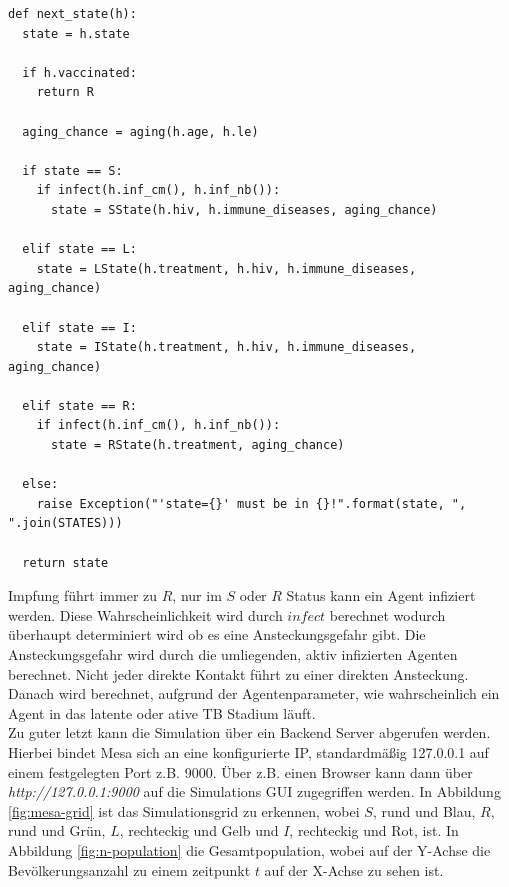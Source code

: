 \documentclass[paper=a4, fontsize=11pt, ngerman, abstract=on]{scrartcl}
\numberwithin{equation}{section} %
\numberwithin{figure}{section} %
\numberwithin{table}{section} %
\begin{document}
\begin{lstlisting}[style=python]
def next_state(h):
  state = h.state

  if h.vaccinated:
    return R

  aging_chance = aging(h.age, h.le)

  if state == S:
    if infect(h.inf_cm(), h.inf_nb()):
      state = SState(h.hiv, h.immune_diseases, aging_chance)

  elif state == L:
    state = LState(h.treatment, h.hiv, h.immune_diseases, aging_chance)

  elif state == I:
    state = IState(h.treatment, h.hiv, h.immune_diseases, aging_chance)

  elif state == R:
    if infect(h.inf_cm(), h.inf_nb()):
      state = RState(h.treatment, aging_chance)

  else:
    raise Exception("'state={}' must be in {}!".format(state, ", ".join(STATES)))

  return state
\end{lstlisting}

Impfung führt immer zu $R$, nur im $S$ oder $R$ Status kann ein Agent infiziert werden. Diese Wahrscheinlichkeit wird durch $infect$ berechnet wodurch überhaupt determiniert wird ob es eine Ansteckungsgefahr gibt. Die Ansteckungsgefahr wird durch die umliegenden, aktiv infizierten Agenten berechnet. Nicht jeder direkte Kontakt führt zu einer direkten Ansteckung. Danach wird berechnet, aufgrund der Agentenparameter, wie wahrscheinlich ein Agent in das latente oder ative TB Stadium läuft. \\

Zu guter letzt kann die Simulation über ein Backend Server abgerufen werden. Hierbei bindet Mesa sich an eine konfigurierte IP, standardmäßig 127.0.0.1 auf einem festgelegten Port z.B. 9000. Über z.B. einen Browser kann dann über \textit{http://127.0.0.1:9000} auf die Simulations GUI zugegriffen werden. In Abbildung \ref{fig:mesa-grid} ist das Simulationsgrid zu erkennen, wobei $S$, rund und Blau, $R$, rund und Grün, $L$, rechteckig und Gelb und $I$, rechteckig und Rot, ist. In Abbildung \ref{fig:n-population} die Gesamtpopulation, wobei auf der Y-Achse die Bevölkerungsanzahl zu einem zeitpunkt $t$ auf der X-Achse zu sehen ist.
\end{document}
